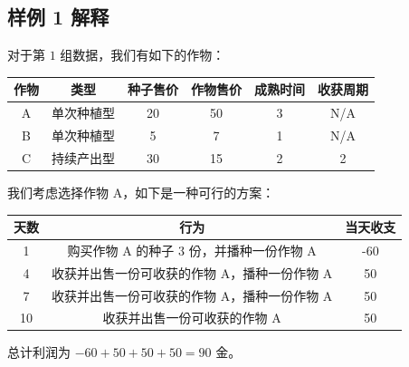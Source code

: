 \subsection{样例 1 解释}

对于第 $1$ 组数据，我们有如下的作物：

\begin{table}[htbp]
\begin{center}
\begin{tabular}{@{}cccccc@{}}
\toprule
作物 & 类型    & 种子售价 & 作物售价 & 成熟时间 & 收获周期 \\ \midrule
A  & 单次种植型 & 20   & 50   & 3    & N/A  \\
B  & 单次种植型 & 5    & 7    & 1    & N/A  \\
C  & 持续产出型 & 30   & 15   & 2    & 2    \\ \bottomrule
\end{tabular}
\end{center}
\end{table}

我们考虑选择作物 A，如下是一种可行的方案：

\begin{table}[htbp]
\begin{center}
\begin{tabular}{@{}ccc@{}}
\toprule
天数 & 行为                         & 当天收支 \\ \midrule
1  & 购买作物 A 的种子 $3$ 份，并播种一份作物 A & -60     \\
4  & 收获并出售一份可收获的作物 A，播种一份作物 A   & 50     \\
7  & 收获并出售一份可收获的作物 A，播种一份作物 A   & 50      \\
10 & 收获并出售一份可收获的作物 A            & 50      \\ \bottomrule
\end{tabular}
\end{center}
\end{table}

总计利润为 $-60+50+50+50 = 90$ 金。



